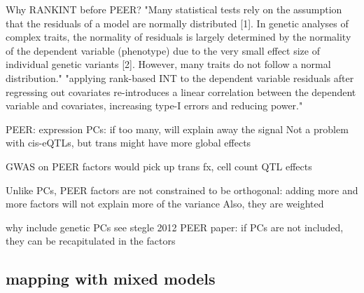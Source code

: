 
Why RANKINT before PEER?
"Many statistical tests rely on the assumption that the residuals of a model are normally distributed [1]. In genetic analyses of complex traits, the normality of residuals is largely determined by the normality of the dependent variable (phenotype) due to the very small effect size of individual genetic variants [2]. However, many traits do not follow a normal distribution."
"applying rank-based INT to the dependent variable residuals after regressing out covariates re-introduces a linear correlation between the dependent variable and covariates, increasing type-I errors and reducing power."

PEER:
expression PCs: if too many, will explain away the signal
Not a problem with cis-eQTLs, but trans might have more global effects

    GWAS on PEER factors would pick up trans fx, cell count QTL effects

Unlike PCs, PEER factors are not constrained to be orthogonal: adding more and more factors will not explain more of the variance
    Also, they are weighted

why include genetic PCs
see stegle 2012 PEER paper: if PCs are not included, they can be recapitulated in the factors

\subsection{ mapping with mixed models}

